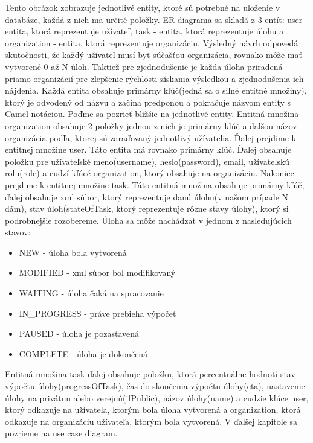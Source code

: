 Tento obrázok zobrazuje jednotlivé entity, ktoré sú potrebné na uloženie v databáze, každá z nich ma určité položky. ER diagrama sa skladá z 3 entít: user - entita, ktorá reprezentuje užívateľ, task - entita, ktorá reprezentuje úlohu a organization - entita, ktorá reprezentuje organizáciu. Výsledný návrh odpovedá skutočnosti, že každý užívateľ musí byť súčašťou organizácia, rovnako môže mať vytvorené 0 až N úloh. Taktiež pre zjednodušenie je každa úloha priradená priamo organizácií pre zlepšenie rýchlosti získania výsledkou a zjednodušenia ich nájdenia. Každá entita obsahuje primárny kľúč(jedná sa o silné entitné množiny), ktorý je odvodený od názvu a začína predponou  a pokračuje názvom entity s Camel notáciou. Poďme sa pozrieť bližšie na jednotlivé entity. Entitná množina organization obsahuje 2 položky jednou z nich je primárny klúč a ďalšou názov organizácia podľa, ktorej sú zaraďovaný jednotlivý užívatelia. Ďalej prejdime k entitnej množine user. Táto entita má rovnako primárny kľúč. Ďalej obsahuje položku pre užívateľské meno(username), heslo(password), email, užívateľskú rolu(role) a cudzí kľúcč organization, ktorý obsahuje na organizáciu. Nakoniec prejdime k entitnej množine task. Táto entitná množina obsahuje primárny kľúč, ďalej obsahuje xml súbor, ktorý reprezentuje danú úlohu(v našom prípade N dám), stav úloh(stateOfTask, ktorý reprezentuje rôzne stavy úlohy), ktorý si podrobnejšie rozobereme. Úloha sa môže nachádzať v jednom z nasledujúcich stavov:
\begin{itemize}
\item NEW - úloha bola vytvorená
\item MODIFIED - xml súbor bol modifikovaný
\item WAITING - úloha čaká na spracovanie
\item IN\_PROGRESS - práve prebieha výpočet
\item PAUSED - úloha je pozastavená
\item COMPLETE - úloha je dokončená
\end{itemize}
Entitná množina task ďalej obsahuje položku, ktorá percentuálne hodnotí stav výpočtu úlohy(progressOfTask), čas do skončenia výpočtu úlohy(eta), nastavenie úlohy na privátnu alebo verejnú(ifPublic), názov úlohy(name) a cudzie kľúce user, ktorý odkazuje na užívateľa, ktorým bola úloha vytvorená a organization, ktorá odkazuje na organizáciu užívateľa, ktorým bola vytvorená. V ďalšej kapitole sa pozrieme na use case diagram.

